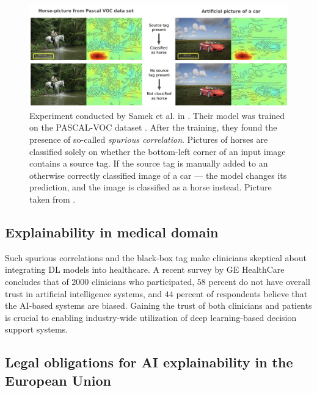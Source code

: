 \begin{figure}[!h]
    \begin{center}
    \begin{minipage}{1\textwidth}
      \includegraphics[width=\textwidth]{img/horse-tag.png}
    \end{minipage}
    \caption{Experiment conducted by Samek et al. in \cite{xai-horse}. Their model was trained on the PASCAL-VOC dataset \cite{pascal-voc}. After the training, they found the presence of so-called \emph{spurious correlation}. Pictures of horses are classified solely on whether the bottom-left corner of an input image contains a source tag. If the source tag is manually added to an otherwise correctly classified image of a car --- the model changes its prediction, and the image is classified as a horse instead. Picture taken from \cite{xai-horse}.}
    \label{fig:horse-tag}
    \end{center}

\end{figure}

\subsection*{Explainability in medical domain}

Such spurious correlations and the black-box tag make clinicians skeptical about integrating DL models into healthcare.
A recent survey by GE HealthCare \cite{ge-healthcare-survey} concludes that of $2000$ clinicians who participated, $58$ percent do not have overall trust in artificial intelligence systems, and $44$ percent of respondents believe that the AI-based systems are biased.
Gaining the trust of both clinicians and patients is crucial to enabling industry-wide utilization of deep learning-based decision support systems.

\subsection*{Legal obligations for AI explainability in the European Union}

